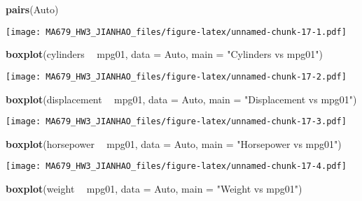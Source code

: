 \documentclass[]{article}
\newenvironment{Shaded}{\begin{snugshade}}{\end{snugshade}}
\newcommand{\KeywordTok}[1]{\textcolor[rgb]{0.13,0.29,0.53}{\textbf{#1}}}
\newcommand{\DataTypeTok}[1]{\textcolor[rgb]{0.13,0.29,0.53}{#1}}
\newcommand{\StringTok}[1]{\textcolor[rgb]{0.31,0.60,0.02}{#1}}
\newcommand{\OperatorTok}[1]{\textcolor[rgb]{0.81,0.36,0.00}{\textbf{#1}}}
\newcommand{\NormalTok}[1]{#1}
\begin{document}
\begin{Shaded}
\begin{Highlighting}[]
\KeywordTok{pairs}\NormalTok{(Auto)}
\end{Highlighting}
\end{Shaded}

\texttt{[image: MA679\_HW3\_JIANHAO\_files/figure-latex/unnamed-chunk-17-1.pdf]}

\begin{Shaded}
\begin{Highlighting}[]
\KeywordTok{boxplot}\NormalTok{(cylinders }\OperatorTok{~}\StringTok{ }\NormalTok{mpg01, }\DataTypeTok{data =}\NormalTok{ Auto, }\DataTypeTok{main =} \StringTok{"Cylinders vs mpg01"}\NormalTok{)}
\end{Highlighting}
\end{Shaded}

\texttt{[image: MA679\_HW3\_JIANHAO\_files/figure-latex/unnamed-chunk-17-2.pdf]}

\begin{Shaded}
\begin{Highlighting}[]
\KeywordTok{boxplot}\NormalTok{(displacement }\OperatorTok{~}\StringTok{ }\NormalTok{mpg01, }\DataTypeTok{data =}\NormalTok{ Auto, }\DataTypeTok{main =} \StringTok{"Displacement vs mpg01"}\NormalTok{)}
\end{Highlighting}
\end{Shaded}

\texttt{[image: MA679\_HW3\_JIANHAO\_files/figure-latex/unnamed-chunk-17-3.pdf]}

\begin{Shaded}
\begin{Highlighting}[]
\KeywordTok{boxplot}\NormalTok{(horsepower }\OperatorTok{~}\StringTok{ }\NormalTok{mpg01, }\DataTypeTok{data =}\NormalTok{ Auto, }\DataTypeTok{main =} \StringTok{"Horsepower vs mpg01"}\NormalTok{)}
\end{Highlighting}
\end{Shaded}

\texttt{[image: MA679\_HW3\_JIANHAO\_files/figure-latex/unnamed-chunk-17-4.pdf]}

\begin{Shaded}
\begin{Highlighting}[]
\KeywordTok{boxplot}\NormalTok{(weight }\OperatorTok{~}\StringTok{ }\NormalTok{mpg01, }\DataTypeTok{data =}\NormalTok{ Auto, }\DataTypeTok{main =} \StringTok{"Weight vs mpg01"}\NormalTok{)}
\end{Highlighting}
\end{Shaded}
\end{document}
